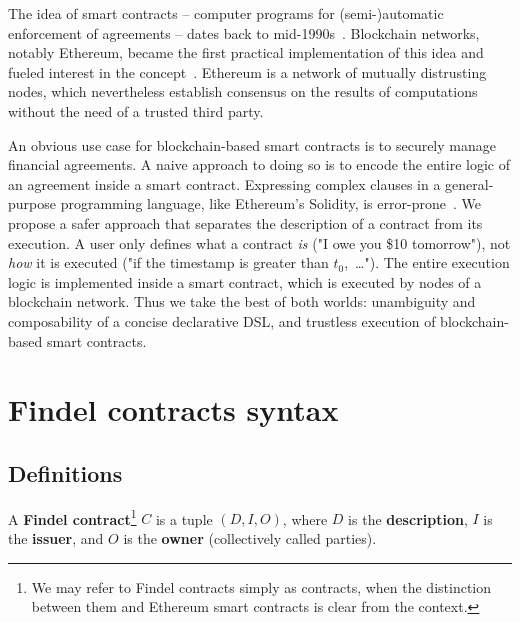 The idea of smart contracts -- computer programs for (semi-)automatic enforcement of agreements -- dates back to mid-1990s~\cite{Szabo1997}.
Blockchain networks, notably Ethereum, became the first practical implementation of this idea and fueled interest in the concept~\cite{Castillo2016}.
Ethereum is a network of mutually distrusting nodes, which nevertheless establish consensus on the results of computations without the need of a trusted third party.

An obvious use case for blockchain-based smart contracts is to securely manage financial agreements.
A naive approach to doing so is to encode the entire logic of an agreement inside a smart contract.
Expressing complex clauses in a general-purpose programming language, like Ethereum's Solidity, is error-prone~\cite{Sirer2016, Atzei2017}.
We propose a safer approach that separates the description of a contract from its execution.
A user only defines what a contract \textit{is} ("I owe you \$10 tomorrow"), not \textit{how} it is executed ("if the timestamp is greater than $t_0$,~\dots").
The entire execution logic is implemented inside a smart contract, which is executed by nodes of a blockchain network.
Thus we take the best of both worlds: unambiguity and composability of a concise declarative DSL, and trustless execution of blockchain-based smart contracts.



\section{Findel contracts syntax} \label{sec:Ch10FindelSyntax}

\subsection{Definitions} \label{sec:Ch10FindelDefinitions}

\begin{definition} \label{def:Ch10FindelFindelContract}
	A \textbf{Findel contract}\footnote{We may refer to Findel contracts simply as contracts, when the distinction between them and Ethereum smart contracts is clear from the context.} $C$ is a tuple $(D,I,O)$, where $D$ is the \textbf{description}, $I$ is the \textbf{issuer}, and $O$ is the \textbf{owner} (collectively called parties). 
\end{definition}

